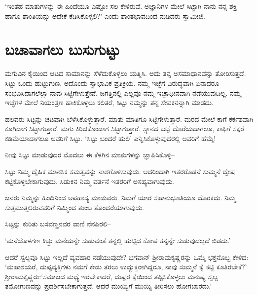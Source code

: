 ‘ಇಂತಹ ಮಾತುಗಳನ್ನು ಈ ಹಿಂದೆಯೂ ಎಷ್ಟೋ ಸಲ ಕೇಳಿರುವೆ. ಅಜ್ಞಾನಿಗಳ ಮೇಲೆ ಸಿಟ್ಟಾಗಿ ನಾನು ನನ್ನ ಶಕ್ತಿ ಹಾಗೂ ಶಾಂತಿಯನ್ನು ಅದೇಕೆ ಕೆಡಿಸಿಕೊಳ್ಳಲಿ?’ ಎಂದು ಶಾಂತಭಾವದಿಂದ ನುಡಿದರು ಸ್ವಾಮೀಜಿ.


\section*{ಬಚಾವಾಗಲು ಬುಸುಗುಟ್ಟು}


ಮಗುವಿನ ಕೈಯಿಂದ ಆಟದ ಸಾಮಾನನ್ನು ಸೆಳೆದುಕೊಳ್ಳಲು ಯತ್ನಿಸಿ. ಅದು ತನ್ನ ಅಸಮಾಧಾನವನ್ನು ತೋರಿಸುತ್ತದೆ. ಸಿಟ್ಟು ಒಂದು ಹುಟ್ಟುಗುಣ, ಅದೊಂದು ಸ್ವಾಭಾವಿಕ ಪ್ರತಿಕ್ರಿಯೆ. ನಮ್ಮ ಇಚ್ಛೆಗೆ ವಿರುದ್ಧವಾಗಿ ಏನಾದರೂ ಸಂಭವಿಸಿದಾಗಲೆಲ್ಲಾ ನಾವು ಸಿಟ್ಟಿಗೇಳುತ್ತೇವೆ. ಜಗತ್ತಿನಲ್ಲಿ ಎಲ್ಲವೂ ನಮ್ಮ ಇಚ್ಛಾಧೀನವಾಗಿ ನಡೆಯುವುದಿಲ್ಲ. ನಮ್ಮ ಇಚ್ಛೆಗಳ ಮೇಲೆ ನಿಯಂತ್ರಣ ಹಾಕಿಕೊಳ್ಳಲು ಕಲಿತರೆ, ಸಿಟ್ಟು ನಮ್ಮನ್ನು ತನ್ನ ಸೇವಕನನ್ನಾಗಿ ಮಾಡದು.

ಹಲವರು ಸಿಟ್ಟನ್ನು ಚಟವಾಗಿ ಬೆಳೆಸಿಕೊಳ್ಳುತ್ತಾರೆ. ಮಾತು ಮಾತಿಗೂ ಸಿಟ್ಟಿಗೇಳುತ್ತಾರೆ. ಮರದ ಮೇಲೆ ಕಾಗೆ ಕರ್ಕಶವಾಗಿ ಕೂಗಿದಾಗ ಸಿಟ್ಟಾಗು\-ತ್ತಾರೆ. ಮಗು ಕಿರಿಚಿಕೊಂಡಾಗ ಸಿಟ್ಟಾಗು\-ತ್ತಾರೆ. ಸ್ನಾನದ ಬಟ್ಟೆ ದೊರೆಯದಾಗಲೂ, ಕಾಫಿಗೆ ಸಕ್ಕರೆ ಕಡಿಮೆಯಾದಾಗಲೂ ಅವರಿಗೆ ಸಿಟ್ಟು. ‘ಸಿಟ್ಟು ಬಂದರೆ ಹುಲಿ’ ಎನ್ನಿಸಿಕೊಳ್ಳುವುದರಲ್ಲಿ ಅವರಿಗೆ ಹೆಮ್ಮೆ!

ನೀವು ಸಿಟ್ಟು ಮಾಡುವುದರ ಮೊದಲು ಈ ಕೆಳಗಿನ ಮಾತುಗಳನ್ನು ಜ್ಞಾಪಿಸಿಕೊಳ್ಳಿ–

ಸಿಟ್ಟು ನಿಮ್ಮ ದೈಹಿಕ ಮಾನಸಿಕ ಸಮತ್ವವನ್ನು ನಾಶಗೊಳಿಸುವುದು. ಅದರಿಂದಾಗಿ ಇತರ\-ರೊಡನೆ ಸುಮ್ಮನೆ ದ್ವೇಷ ಕಟ್ಟಿಕೊಳ್ಳಬೇಕಾಗುವುದು. ಸಿಡುಕಿನ ನಿಮ್ಮ ವರ್ತನೆ ಇತರರಿಗೆ ಅಸಹ್ಯವಾಗುವುದು.

ಜನರು ನಿಮ್ಮನ್ನು ಹಿಂದಿನಿಂದ ಅಪಹಾಸ್ಯ ಮಾಡುವರು. ನಿಮಗೆ ಯಾರ ಸಹಾನು\-ಭೂತಿಯೂ ದೊರಕದು. ನಿಮ್ಮ ಸುತ್ತಮುತ್ತಲಿರುವವರಿಗೆ ನಿಮ್ಮಿಂದ ತುಂಬ ತೊಂದರೆಯಾಗುವುದು.

ಸಿಟ್ಟನ್ನು ಕುರಿತು ಬಸವಣ್ಣನವರ ವಾಣಿ ನೆನಪಿರಲಿ–

‘ಮನೆಯೊಳಗಣ ಕಿಚ್ಚು ಮನೆಯನ್ನೇ ಸುಡುವಂತೆ ತನ್ನಲ್ಲಿ ಹುಟ್ಟಿದ ಕೋಪ ತನ್ನನ್ನೇ ಸುಡುವು\-ದಲ್ಲದೆ ಬಿಡದು.’

\newpage

ಆದರೆ ಸ್ವಲ್ಪವೂ ಸಿಟ್ಟು ಇಲ್ಲದೆ ವ್ಯವಹಾರ ನಡೆಯುವುದೇ? ಭಗವಾನ್ ಶ‍್ರೀರಾಮಕೃಷ್ಣರನ್ನು ಒಮ್ಮೆ ಭಕ್ತನೊಬ್ಬ ಕೇಳಿದ: ‘ಮಹಾಶಯರೆ, ದುಷ್ಟವ್ಯಕ್ತಿಗಳು ನಮಗೆ ಕೇಡು ತರಲು ಉದ್ಯುಕ್ತ\-ರಾಗಿದ್ದರೂ, ನಾವು ಸುಮ್ಮನೆ ಕೈ ಕಟ್ಟಿ ಕೂತಿರಬೇಕೆ?’ ಶ‍್ರೀರಾಮಕೃಷ್ಣರು:‘ಸಮಾಜದ ಮಧ್ಯೆ ಇರಬೇಕಾದರೆ, ದುಷ್ಟರ ಕೈಯಿಂದ ತಪ್ಪಿಸಿಕೊಳ್ಳಲು ಮನುಷ್ಯ ಸ್ವಲ್ಪ ತಮೋಗುಣವನ್ನು ಪ್ರದರ್ಶಿಸ\-ಬೇಕಾಗುತ್ತದೆ. ಆದರೆ ಮುಯ್ಯಿಗೆ ಮುಯ್ಯಿ ತೀರಿಸಲು ಹೋಗಬಾರದು.’

